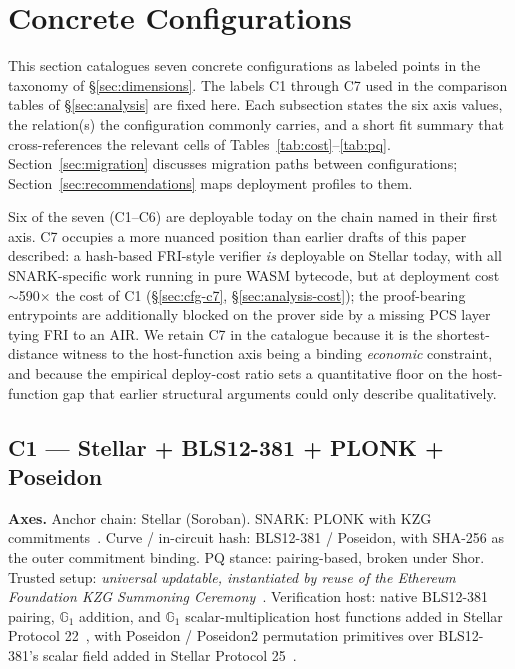 \section{Concrete Configurations}
\label{sec:configurations}

This section catalogues seven concrete configurations as labeled
points in the taxonomy of \S\ref{sec:dimensions}. The labels C1
through C7 used in the comparison tables of \S\ref{sec:analysis} are
fixed here. Each subsection states the six axis values, the
relation(s) the configuration commonly carries, and a short fit
summary that cross-references the relevant cells of
Tables~\ref{tab:cost}--\ref{tab:pq}. Section~\ref{sec:migration}
discusses migration paths between configurations;
Section~\ref{sec:recommendations} maps deployment profiles to them.

Six of the seven (C1--C6) are deployable today on the chain named in
their first axis. C7 occupies a more nuanced position than earlier
drafts of this paper described: a hash-based FRI-style verifier
\emph{is} deployable on Stellar today, with all SNARK-specific work
running in pure WASM bytecode, but at deployment cost
$\sim$590$\times$ the cost of C1 (\S\ref{sec:cfg-c7},
\S\ref{sec:analysis-cost}); the proof-bearing entrypoints are
additionally blocked on the prover side by a missing PCS layer
tying FRI to an AIR. We retain C7 in the catalogue because it is
the shortest-distance witness to the host-function axis being a
binding \emph{economic} constraint, and because the empirical
deploy-cost ratio sets a quantitative floor on the host-function
gap that earlier structural arguments could only describe
qualitatively.

\subsection{C1 --- Stellar + BLS12-381 + PLONK + Poseidon}
\label{sec:cfg-c1}

\textbf{Axes.} Anchor chain: Stellar (Soroban). SNARK: PLONK with
KZG commitments~\cite{gabizon-2019-plonk}. Curve / in-circuit hash:
BLS12-381 / Poseidon, with SHA-256 as the outer commitment binding.
PQ stance: pairing-based, broken under Shor. Trusted setup:
\emph{universal updatable, instantiated by reuse of the Ethereum
Foundation KZG Summoning Ceremony}~\cite{eth-kzg-ceremony}.
Verification host: native BLS12-381 pairing, $\mathbb{G}_1$
addition, and $\mathbb{G}_1$ scalar-multiplication host functions
added in Stellar Protocol 22~\cite{stellar-cap-0059}, with
Poseidon / Poseidon2 permutation primitives over BLS12-381's scalar
field added in Stellar Protocol 25~\cite{stellar-cap-0075}.

